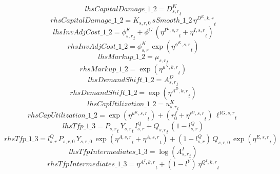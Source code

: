 \begin{dmath*}
lhsCapitalDamage\_1\_2 = {{D^K_{s,r}}}_{t}
\end{dmath*}
\begin{dmath*}
rhsCapitalDamage\_1\_2 = {{K_{s,r,0}}}\, {sSmooth\_1\_2}\, {{\eta^{D^{K},k,r}}}_{t}
\end{dmath*}
\begin{dmath*}
lhsInvAdjCost\_1\_2 = {{\phi^K_{s,r}}}_{t}+{{\phi^{G}}}\, \left({{\eta^{P^k,s,r}}}_{t}+{{\eta^{I,s,r}}}_{t}\right)
\end{dmath*}
\begin{dmath*}
rhsInvAdjCost\_1\_2 = {{\phi^{K}_{s,r}}}\, \exp\left({{\eta^{\phi^{K},{s,r}}}}_{t}\right)
\end{dmath*}
\begin{dmath*}
lhsMarkup\_1\_2 = {{\mu_{s,r}}}_{t}
\end{dmath*}
\begin{dmath*}
rhsMarkup\_1\_2 = \exp\left({{\eta^{\mu^{N},k,r}}}_{t}\right)
\end{dmath*}
\begin{dmath*}
lhsDemandShift\_1\_2 = {{A^{D}_{s,r}}}_{t}
\end{dmath*}
\begin{dmath*}
rhsDemandShift\_1\_2 = \exp\left({{\eta^{A^{D},k,r}}}_{t}\right)
\end{dmath*}
\begin{dmath*}
lhsCapUtilization\_1\_2 = {{u^K_{s,r}}}_{t}
\end{dmath*}
\begin{dmath*}
rhsCapUtilization\_1\_2 = \exp\left({{\eta^{u^K,s,r}}}_{t}\right)+\left({{r^f_0}}+{{\eta^{r^G,s,r}}}_{t}\right)\, {{\ell^{IG,s,r}}}_{t}
\end{dmath*}
\begin{dmath*}
lhsTfp\_1\_3 = {{P_{s,r}}}_{t}\, {{Y_{s,r}}}_{t}\, {{l^{Q}_{s,r}}}+{{Q_{s,r}}}_{t}\, \left(1-{{l^{Q}_{s,r}}}\right)
\end{dmath*}
\begin{dmath*}
rhsTfp\_1\_3 = {{l^{Q}_{s,r}}}\, {{P_{s,r,0}}}\, {{Y_{s,r,0}}}\, \exp\left({{\eta^{A,s,r}}}_{t}+{{\eta^{A,s,r}}}_{t}\right)+\left(1-{{l^{Q}_{s,r}}}\right)\, {{Q_{s,r,0}}}\, \exp\left({{\eta^{E,s,r}}}_{t}\right)
\end{dmath*}
\begin{dmath*}
lhsTfpIntermediates\_1\_3 = \log\left({{A^{I}_{s,r}}}_{t}\right)
\end{dmath*}
\begin{dmath*}
rhsTfpIntermediates\_1\_3 = {{\eta^{A^{I},k,r}}}_{t}+\left(1-{{l^{Y}}}\right)\, {{\eta^{Q^{I},k,r}}}_{t}
\end{dmath*}
